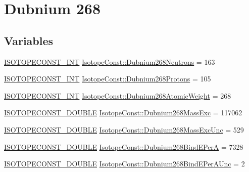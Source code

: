 \hypertarget{group___isotope_const-_dubnium-_db268}{}\section{Dubnium 268}
\label{group___isotope_const-_dubnium-_db268}
\subsection*{Variables}
\begin{DoxyCompactItemize}
\item 
\mbox{\hyperlink{group___isotope_const-_macros_ga5f18360b3e99483a35c32d789e62621c}{I\+S\+O\+T\+O\+P\+E\+C\+O\+N\+S\+T\+\_\+\+I\+NT}} \mbox{\hyperlink{group___isotope_const-_dubnium-_db268_gae65424addfb75f3a6fe40fcdf55811e5}{Isotope\+Const\+::\+Dubnium268\+Neutrons}} = 163
\item 
\mbox{\hyperlink{group___isotope_const-_macros_ga5f18360b3e99483a35c32d789e62621c}{I\+S\+O\+T\+O\+P\+E\+C\+O\+N\+S\+T\+\_\+\+I\+NT}} \mbox{\hyperlink{group___isotope_const-_dubnium-_db268_ga67897f5367833533dc32f01d55655549}{Isotope\+Const\+::\+Dubnium268\+Protons}} = 105
\item 
\mbox{\hyperlink{group___isotope_const-_macros_ga5f18360b3e99483a35c32d789e62621c}{I\+S\+O\+T\+O\+P\+E\+C\+O\+N\+S\+T\+\_\+\+I\+NT}} \mbox{\hyperlink{group___isotope_const-_dubnium-_db268_gafb335725386c32f16ef73ac45dcbe993}{Isotope\+Const\+::\+Dubnium268\+Atomic\+Weight}} = 268
\item 
\mbox{\hyperlink{group___isotope_const-_macros_ga8f45a7272ce02c0b4c65c44636ed719a}{I\+S\+O\+T\+O\+P\+E\+C\+O\+N\+S\+T\+\_\+\+D\+O\+U\+B\+LE}} \mbox{\hyperlink{group___isotope_const-_dubnium-_db268_ga4389e9ccf73b032ad2488ee9b313e788}{Isotope\+Const\+::\+Dubnium268\+Mass\+Exc}} = 117062
\item 
\mbox{\hyperlink{group___isotope_const-_macros_ga8f45a7272ce02c0b4c65c44636ed719a}{I\+S\+O\+T\+O\+P\+E\+C\+O\+N\+S\+T\+\_\+\+D\+O\+U\+B\+LE}} \mbox{\hyperlink{group___isotope_const-_dubnium-_db268_gac54cd3c57129cd76c2ed2fc50decee45}{Isotope\+Const\+::\+Dubnium268\+Mass\+Exc\+Unc}} = 529
\item 
\mbox{\hyperlink{group___isotope_const-_macros_ga8f45a7272ce02c0b4c65c44636ed719a}{I\+S\+O\+T\+O\+P\+E\+C\+O\+N\+S\+T\+\_\+\+D\+O\+U\+B\+LE}} \mbox{\hyperlink{group___isotope_const-_dubnium-_db268_ga63b35d7222b7cddd7972aee32853a763}{Isotope\+Const\+::\+Dubnium268\+Bind\+E\+PerA}} = 7328
\item 
\mbox{\hyperlink{group___isotope_const-_macros_ga8f45a7272ce02c0b4c65c44636ed719a}{I\+S\+O\+T\+O\+P\+E\+C\+O\+N\+S\+T\+\_\+\+D\+O\+U\+B\+LE}} \mbox{\hyperlink{group___isotope_const-_dubnium-_db268_ga9fb5d7bbaedab67f4bcdb920491d17ee}{Isotope\+Const\+::\+Dubnium268\+Bind\+E\+Per\+A\+Unc}} = 2

\end{DoxyCompactItemize}
